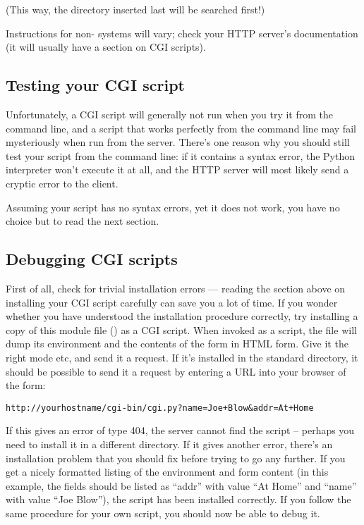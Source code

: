 (This way, the directory inserted last will be searched first!)

Instructions for non-\UNIX{} systems will vary; check your HTTP server's
documentation (it will usually have a section on CGI scripts).


\subsection{Testing your CGI script}

Unfortunately, a CGI script will generally not run when you try it
from the command line, and a script that works perfectly from the
command line may fail mysteriously when run from the server.  There's
one reason why you should still test your script from the command
line: if it contains a syntax error, the Python interpreter won't
execute it at all, and the HTTP server will most likely send a cryptic
error to the client.

Assuming your script has no syntax errors, yet it does not work, you
have no choice but to read the next section.


\subsection{Debugging CGI scripts} 

First of all, check for trivial installation errors --- reading the
section above on installing your CGI script carefully can save you a
lot of time.  If you wonder whether you have understood the
installation procedure correctly, try installing a copy of this module
file () as a CGI script.  When invoked as a script, the file
will dump its environment and the contents of the form in HTML form.
Give it the right mode etc, and send it a request.  If it's installed
in the standard  directory, it should be possible to send it a
request by entering a URL into your browser of the form:

\begin{verbatim}
http://yourhostname/cgi-bin/cgi.py?name=Joe+Blow&addr=At+Home
\end{verbatim}

If this gives an error of type 404, the server cannot find the script
-- perhaps you need to install it in a different directory.  If it
gives another error, there's an installation problem that
you should fix before trying to go any further.  If you get a nicely
formatted listing of the environment and form content (in this
example, the fields should be listed as ``addr'' with value ``At Home''
and ``name'' with value ``Joe Blow''), the  script has been
installed correctly.  If you follow the same procedure for your own
script, you should now be able to debug it.

